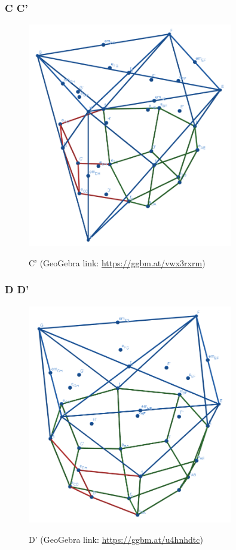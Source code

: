\documentclass{article}
\begin{document}
\subsubsection{C \rightarrow C'}
\begin{figure}[H]
\caption{C' (GeoGebra link: \href{https://ggbm.at/vwx3rxrm}{https://ggbm.at/vwx3rxrm})}
\centering
\includegraphics[width=0.8\textwidth]{images/cl-07-3.png}
\label{fig:cube7-3}
\end{figure}
\subsubsection{D \rightarrow D'}
\begin{figure}[H]
\caption{D' (GeoGebra link: \href{https://ggbm.at/u4hnhdtc}{https://ggbm.at/u4hnhdtc})}
\centering
\includegraphics[width=0.8\textwidth]{images/cl-07-4.png}
\label{fig:cube7-4}
\end{figure}
\end{document}
